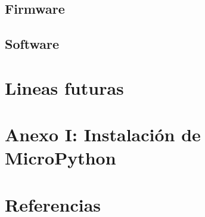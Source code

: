     \section{Firmware}
      
      \newpage

    \section{Software}
      

    
  \chapter{Lineas futuras}
    


  \chapter{Anexo I: Instalación de MicroPython}
    


  \nocite{latex-rust}
  \chapter{Referencias}
    \printbibliography[heading=none]


